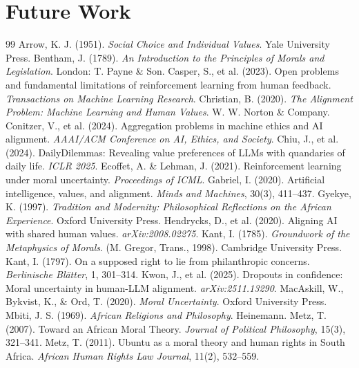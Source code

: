 \documentclass[10pt,twocolumn,a4paper]{article}
\begin{document}
\section{Future Work}

\begin{thebibliography}{99}
\footnotesize
{} Arrow, K. J. (1951). \textit{Social Choice and Individual Values}. Yale University Press.
 Bentham, J. (1789). \textit{An Introduction to the Principles of Morals and Legislation}. London: T. Payne \& Son.
 Casper, S., et al. (2023). Open problems and fundamental limitations of reinforcement learning from human feedback. \textit{Transactions on Machine Learning Research}.
 Christian, B. (2020). \textit{The Alignment Problem: Machine Learning and Human Values}. W. W. Norton \& Company.
 Conitzer, V., et al. (2024). Aggregation problems in machine ethics and AI alignment. \textit{AAAI/ACM Conference on AI, Ethics, and Society}.
 Chiu, J., et al. (2024). DailyDilemmas: Revealing value preferences of LLMs with quandaries of daily life. \textit{ICLR 2025}.
 Ecoffet, A. \& Lehman, J. (2021). Reinforcement learning under moral uncertainty. \textit{Proceedings of ICML}.
 Gabriel, I. (2020). Artificial intelligence, values, and alignment. \textit{Minds and Machines}, 30(3), 411--437.
 Gyekye, K. (1997). \textit{Tradition and Modernity: Philosophical Reflections on the African Experience}. Oxford University Press.
 Hendrycks, D., et al. (2020). Aligning AI with shared human values. \textit{arXiv:2008.02275}.
 Kant, I. (1785). \textit{Groundwork of the Metaphysics of Morals}. (M. Gregor, Trans., 1998). Cambridge University Press.
 Kant, I. (1797). On a supposed right to lie from philanthropic concerns. \textit{Berlinische Bl\"{a}tter}, 1, 301--314.
 Kwon, J., et al. (2025). Dropouts in confidence: Moral uncertainty in human-LLM alignment. \textit{arXiv:2511.13290}.
 MacAskill, W., Bykvist, K., \& Ord, T. (2020). \textit{Moral Uncertainty}. Oxford University Press.
 Mbiti, J. S. (1969). \textit{African Religions and Philosophy}. Heinemann.
 Metz, T. (2007). Toward an African Moral Theory. \textit{Journal of Political Philosophy}, 15(3), 321--341.
 Metz, T. (2011). Ubuntu as a moral theory and human rights in South Africa. \textit{African Human Rights Law Journal}, 11(2), 532--559.

\end{thebibliography}
\end{document}
